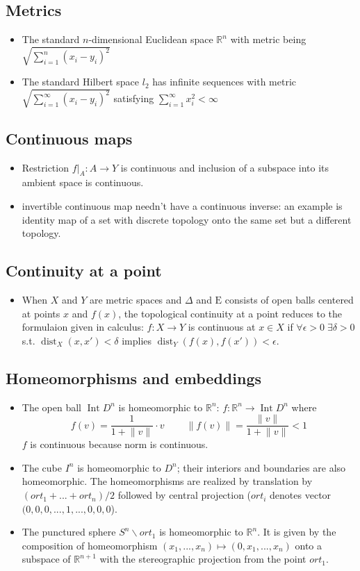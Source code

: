 \documentclass{article}
\DeclareMathOperator{\Int}{Int}
\DeclareMathOperator{\dist}{dist}
\begin{document}
\subsection{Metrics}
\begin{itemize}
\item The standard \(n\)-dimensional Euclidean space \(\mathbb{R}^{n}\) with metric being \(\sqrt{\sum_{i=1}^{n}(x_{i}-y_{i})^{2}}\)
\item The standard Hilbert space \(l_{2}\) has infinite sequences with metric \(\sqrt{\sum_{i=1}^{\infty}(x_{i}-y_{i})^{2}}\) satisfying \(\sum_{i=1}^{\infty}x_{i}^{2}<\infty\)
\end{itemize}
\subsection{Continuous maps}
\begin{itemize}
\item Restriction \(f|_{A}:A\to Y\) is continuous and inclusion of a subspace into its ambient space is continuous.  
\item invertible continuous map needn't have a continuous inverse: an example is identity map of a set with discrete topology onto the same set but a different topology.
\end{itemize}
\subsection{Continuity at a point}
\begin{itemize}
\item When \(X\) and \(Y\) are metric spaces and \(\Delta\) and \(\text{E}\) consists of open balls centered at points \(x\) and \(f(x)\), the topological continuity at a point reduces to the formulaion given in calculus: 
\(f:X\to Y\) is continuous at \(x\in X\) if \(\forall\epsilon > 0\;\exists\delta>0\) s.t. \(\dist_{X}(x,x')<\delta\) implies \(\dist_{Y}(f(x),f(x'))<\epsilon\).
\end{itemize}
\subsection{Homeomorphisms and embeddings}
\begin{itemize}
\item The open ball \(\Int D^{n}\) is homeomorphic to \(\mathbb{R}^{n}\): 
\(f:\mathbb{R}^{n}\to \Int D^{n}\) where \[f(v)=\frac{1}{1+\lVert v\rVert}\cdot v\;\;\;\;\;\;\;\; \lVert f(v)\rVert=\frac{\lVert v\rVert}{1+\lVert v\rVert}<1\]
\(f\) is continuous because norm is continuous.    
\item The cube \(I^{n}\) is homeomorphic to \(D^{n}\); their interiors and boundaries are also homeomorphic. The homeomorphisms are realized by translation by 
\((ort_{1}+...+ort_{n})/2\) followed by central projection (\(ort_{i}\) denotes vector \((0,0,0,...,1,...,0,0,0\)).
\item The punctured sphere \(S^{n}\backslash ort_{1}\) is homeomorphic to \(\mathbb{R}^{n}\). It is given by the composition of homeomorphism 
\((x_{1},...,x_{n})\mapsto (0,x_{1},...,x_{n})\) onto a subspace of \(\mathbb{R}^{n+1}\) with the stereographic projection from the point \(ort_1\).
\end{itemize}
\end{document}
